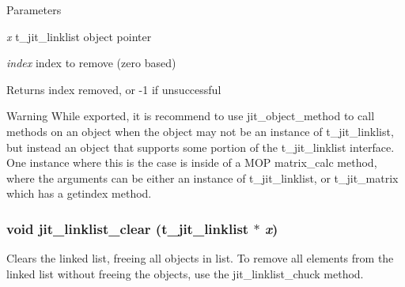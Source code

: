 \begin{DoxyParams}{Parameters}
\item[{\em x}]t\_\-jit\_\-linklist object pointer \item[{\em index}]index to remove (zero based)\end{DoxyParams}
\begin{DoxyReturn}{Returns}
index removed, or -\/1 if unsuccessful
\end{DoxyReturn}
\begin{DoxyWarning}{Warning}
While exported, it is recommend to use jit\_\-object\_\-method to call methods on an object when the object may not be an instance of t\_\-jit\_\-linklist, but instead an object that supports some portion of the t\_\-jit\_\-linklist interface. One instance where this is the case is inside of a MOP matrix\_\-calc method, where the arguments can be either an instance of t\_\-jit\_\-linklist, or t\_\-jit\_\-matrix which has a getindex method. 
\end{DoxyWarning}
\hypertarget{group__linklistmod_gad38efced2bcc418a6daa82a41221ea3c}{
\subsubsection[{jit\_\-linklist\_\-clear}]{\setlength{\rightskip}{0pt plus 5cm}void jit\_\-linklist\_\-clear (t\_\-jit\_\-linklist $\ast$ {\em x})}}
\label{group__linklistmod_gad38efced2bcc418a6daa82a41221ea3c}


Clears the linked list, freeing all objects in list. To remove all elements from the linked list without freeing the objects, use the jit\_\-linklist\_\-chuck method.


